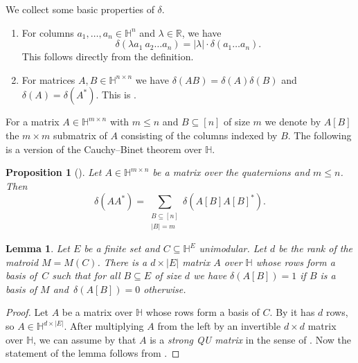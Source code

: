 \documentclass[11pt]{article}
\newtheorem{lem}[theo]{Lemma}
\newtheorem{prop}[theo]{Proposition}
\theoremstyle{definition}
\numberwithin{equation}{section}
\newcommand{\R}{{\mathbb R}}
\newcommand{\HH}{{\mathbb H}}
\begin{document}
\begin{rem}\label{rem:deltaHom}We collect some basic properties of $\delta$.
\begin{enumerate}
    \item For columns $a_1,\ldots,a_n\in\HH^n$ and $\lambda\in\R$, we have
    \begin{equation*}
      \delta(\lambda a_1\ a_2\ldots a_n)=|\lambda|\cdot\delta(a_1\ldots a_n).  
    \end{equation*}
    This follows directly from the definition.
    \item For matrices $A,B\in\HH^{n\times n}$ we have $\delta(AB)=\delta(A)\delta(B)$ and $\delta(A)=\delta(A^*)$. This is \cite[Lemma~5.2]{skewpartial}.
\end{enumerate}
\end{rem}

For a matrix $A\in\HH^{m\times n}$ with $m\leq n$ and $B\subseteq[n]$ of size $m$ we denote by $A[B]$ the $m\times m$ submatrix of $A$ consisting of the columns indexed by $B$.
The following is a version of the Cauchy--Binet theorem over $\HH$.

\begin{prop}[{\cite[Theorem 5.1]{skewpartial}}]\label{prop:CauchyBinetQuat}
    Let $A\in\HH^{m\times n}$ be a matrix over the quaternions and $m\leq n$. Then
    \begin{equation*}
        \delta(AA^*)=\sum_{\substack{B\subseteq[n]\\|B|=m}}\delta(A[B]A[B]^*).
    \end{equation*}
\end{prop}

\begin{lem}\label{lem:basisIffDelta1}
    Let $E$ be a finite set and $C\subseteq\HH^E$ unimodular. Let $d$ be the rank of the matroid $M=M(C)$.
    There is a $d\times |E|$ matrix $A$ over $\HH$ whose rows form a basis of~$C$ such that for all $B\subseteq E$ of size $d$ we have $\delta(A[B])=1$ if $B$ is a basis of $M$ and~$\delta(A[B])=0$ otherwise.
\end{lem}

\begin{proof}
 Let $A$ be a matrix over $\HH$ whose rows form a basis of $C$. By \cite[Lemma~3.14]{skewpartial} it has $d$ rows, so $A\in\HH^{d\times |E|}$. After multiplying $A$ from the left by an invertible $d\times d$ matrix over $\HH$, we can assume by \cite[Corollary~3.26]{skewpartial} that $A$ is a \emph{strong QU matrix} in the sense of \cite[Definition~3.23]{skewpartial}. Now the statement of the lemma follows from {\cite[Claim 5.4.1]{skewpartial}}.
\end{proof}
\end{document}
